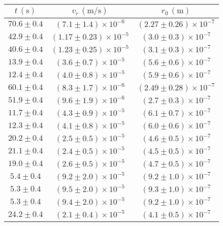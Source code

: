 \begin{longtable}[C]{|c|c|c|}
            \hline
            $t \, (\mathrm{s})$ & $v_r \, (\mathrm{m/s})$ & $r_0 \, (\mathrm{m})$ \\
            \hline
            $70.6 \pm 0.4$ & $(7.1 \pm 1.4) \times 10^{-6}$ & $(2.27 \pm 0.26) \times 10^{-7}$ \\
            \hline
            $42.9 \pm 0.4$ & $(1.17 \pm 0.23) \times 10^{-5}$ & $(3.0 \pm 0.3) \times 10^{-7}$ \\
            \hline
            $40.6 \pm 0.4$ & $(1.23 \pm 0.25) \times 10^{-5}$ & $(3.1 \pm 0.3) \times 10^{-7}$ \\
            \hline
            $13.9 \pm 0.4$ & $(3.6 \pm 0.7) \times 10^{-5}$ & $(5.6 \pm 0.6) \times 10^{-7}$ \\
            \hline
            $12.4 \pm 0.4$ & $(4.0 \pm 0.8) \times 10^{-5}$ & $(5.9 \pm 0.6) \times 10^{-7}$ \\
            \hline
            $60.1 \pm 0.4$ & $(8.3 \pm 1.7) \times 10^{-6}$ & $(2.49 \pm 0.28) \times 10^{-7}$ \\
            \hline
            $51.9 \pm 0.4$ & $(9.6 \pm 1.9) \times 10^{-6}$ & $(2.7 \pm 0.3) \times 10^{-7}$ \\
            \hline
            $11.7 \pm 0.4$ & $(4.3 \pm 0.9) \times 10^{-5}$ & $(6.1 \pm 0.7) \times 10^{-7}$ \\
            \hline
            $12.3 \pm 0.4$ & $(4.1 \pm 0.8) \times 10^{-5}$ & $(6.0 \pm 0.6) \times 10^{-7}$ \\
            \hline
            $20.2 \pm 0.4$ & $(2.5 \pm 0.5) \times 10^{-5}$ & $(4.6 \pm 0.5) \times 10^{-7}$ \\
            \hline
            $21.1 \pm 0.4$ & $(2.4 \pm 0.5) \times 10^{-5}$ & $(4.5 \pm 0.5) \times 10^{-7}$ \\
            \hline
            $19.0 \pm 0.4$ & $(2.6 \pm 0.5) \times 10^{-5}$ & $(4.7 \pm 0.5) \times 10^{-7}$ \\
            \hline
            $5.4 \pm 0.4$ & $(9.2 \pm 2.0) \times 10^{-5}$ & $(9.2 \pm 1.0) \times 10^{-7}$ \\
            \hline
            $5.3 \pm 0.4$ & $(9.5 \pm 2.0) \times 10^{-5}$ & $(9.3 \pm 1.0) \times 10^{-7}$ \\
            \hline
            $5.3 \pm 0.4$ & $(9.4 \pm 2.0) \times 10^{-5}$ & $(9.2 \pm 1.0) \times 10^{-7}$ \\
            \hline
            $24.2 \pm 0.4$ & $(2.1 \pm 0.4) \times 10^{-5}$ & $(4.1 \pm 0.5) \times 10^{-7}$ \\

\end{longtable}
